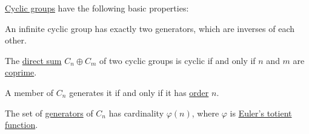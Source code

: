 \begin{proposition}\label{thm:def:cyclic_group}
  \hyperref[def:cyclic_group]{Cyclic groups} have the following basic properties:
  \begin{thmenum}
     An infinite cyclic group has exactly two generators, which are inverses of each other.

     The \hyperref[def:semimodule_direct_sum]{direct sum} \( C_n \oplus C_m \) of two cyclic groups is cyclic if and only if \( n \) and \( m \) are \hyperref[def:coprime_elements]{coprime}.

     A member of \( C_n \) generates it if and only if it has \hyperref[def:group_element_order]{order} \( n \).

     The set of \hyperref[def:group_presentation]{generators} of \( C_n \) has cardinality \( \varphi(n) \), where \( \varphi \) is \hyperref[def:eulers_totient_function]{Euler's totient function}.
  \end{thmenum}
\end{proposition}
